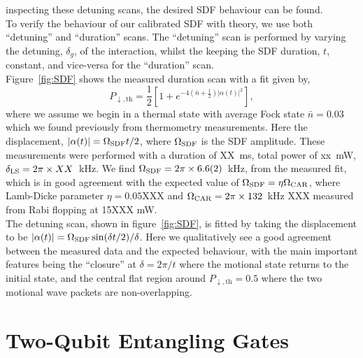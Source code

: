     inspecting these detuning scans, the desired SDF behaviour can be found. \\
    To verify the behaviour of our calibrated SDF with theory, we use both
    ``detuning'' and ``duration'' scans. The ``detuning'' scan is performed by
    varying the detuning, $\delta_g$, of the interaction, whilst the keeping the
    SDF duration, $t$, constant, and vice-versa for the ``duration'' scan. \\
    Figure~\ref{fig:SDF} shows the measured duration scan with a fit given by,
    \begin{equation}
        P_{\downarrow,\mathrm{th}} = \frac{1}{2} \left[ 1 + e^{-4\left( \bar{n} + \frac{1}{2} \right) |\alpha(t)|^2} \right],
    \end{equation}
    where we assume we begin in a thermal state with average Fock state $\bar{n}
    = 0.03$ which we found previously from thermometry measurements. Here the
    displacement, $|\alpha(t)| = \Omega_{\rm SDF} t/2$, where $\Omega_{\rm SDF}$ is the
    SDF amplitude. 
    These measurements were performed with a duration of XX~ms, total power of xx~mW, $\delta_{\rm LS}=2\pi\times XX$~kHz.
    We find $\Omega_{\rm SDF} = 2\pi\times 6.6(2)$~kHz, from the
    measured fit, which is in good agreement with the expected value of
    $\Omega_{\rm SDF} = \eta\Omega_{\rm CAR}$, where Lamb-Dicke parameter $\eta =
    0.05$XXX and $\Omega_{\rm CAR} = 2\pi \times 132$~kHz XXX measured from Rabi
    flopping at 15XXX mW.\\
    The detuning scan, shown in figure~\ref{fig:SDF}, is fitted by taking the
    displacement to be $|\alpha(t)| = \Omega_{\rm SDF} \sin(\delta t/2)/\delta$. Here
    we qualitatively see a good agreement between the measured data and the
    expected behaviour, with the main important features being the ``closure''
    at $\delta = 2\pi/t$ where the motional state returns to the initial state,
    and the central flat region around $P_{\downarrow, \mathrm{th}} =0.5$ where
    the two motional wave packets are non-overlapping.\\


\section{Two-Qubit Entangling Gates}
\label{sec:Two-Qubit Entangling Gates}

